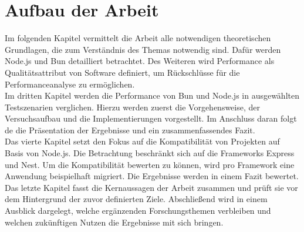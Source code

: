 \section{Aufbau der Arbeit} \label{sec:introduction-overview}
Im folgenden Kapitel vermittelt die Arbeit alle notwendigen theoretischen Grundlagen, die zum Verständnis des Themas notwendig sind. Dafür werden Node.js und Bun detailliert betrachtet. Des Weiteren wird Performance als Qualitätsattribut von Software definiert, um Rückschlüsse für die Performanceanalyse zu ermöglichen.\\

\noindent
Im dritten Kapitel werden die Performance von Bun und Node.js in ausgewählten Testszenarien verglichen. Hierzu werden zuerst die Vorgehensweise, der Versuchsaufbau und die Implementierungen vorgestellt. Im Anschluss daran folgt de die Präsentation der Ergebnisse und ein zusammenfassendes Fazit.\\

\noindent
Das vierte Kapitel setzt den Fokus auf die Kompatibilität von Projekten auf Basis von Node.js. Die Betrachtung beschränkt sich auf die Frameworks Express und Nest. Um die Kompatibilität bewerten zu können, wird pro Framework eine Anwendung beispielhaft migriert. Die Ergebnisse werden in einem Fazit bewertet.\\

\noindent
Das letzte Kapitel fasst die Kernaussagen der Arbeit zusammen und prüft sie vor dem Hintergrund der zuvor definierten Ziele. Abschließend wird in einem Ausblick dargelegt, welche ergänzenden Forschungsthemen verbleiben und welchen zukünftigen Nutzen die Ergebnisse mit sich bringen.